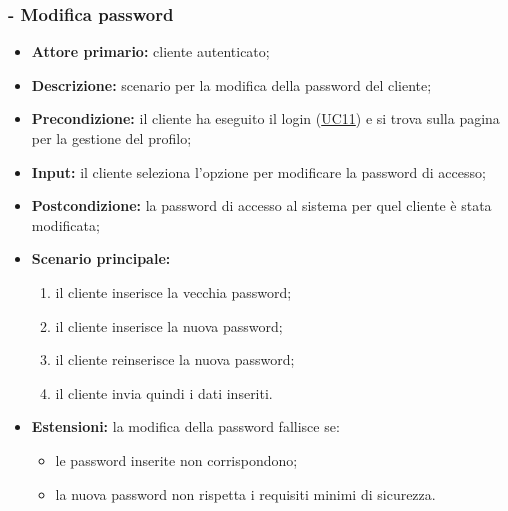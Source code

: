 \subsubsection{ - Modifica password}
\begin{itemize}
    \item \textbf{Attore primario:} cliente autenticato;
    \item \textbf{Descrizione:} scenario per la modifica della password del cliente;
    \item \textbf{Precondizione:} il cliente ha eseguito il login (\hyperref[UC11]{UC11}) e si trova sulla pagina per la gestione del profilo;
    \item \textbf{Input:} il cliente seleziona l'opzione per modificare la password di accesso;
    \item \textbf{Postcondizione:} la password di accesso al sistema per quel cliente è stata modificata;
    \item \textbf{Scenario principale:}
          \begin{enumerate}
              \item il cliente inserisce la vecchia password;
              \item il cliente inserisce la nuova password;
              \item il cliente reinserisce la nuova password;
              \item il cliente invia quindi i dati inseriti.
          \end{enumerate}
    \item \textbf{Estensioni:} la modifica della password fallisce se:
          \begin{itemize}
              \item le password inserite non corrispondono;
              \item la nuova password non rispetta i requisiti minimi di sicurezza.
          \end{itemize}
\end{itemize}

\stepUserCase
